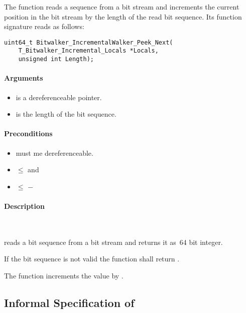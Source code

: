The function \peeknext reads a sequence from a bit stream 
and increments the current position in the bit stream by the 
length of the read bit sequence.
Its function signature reads as follows:\\[1em]


\begin{lstlisting}[style=acsl-block]
uint64_t Bitwalker_IncrementalWalker_Peek_Next(
    T_Bitwalker_Incremental_Locals *Locals,
    unsigned int Length);
\end{lstlisting}


\paragraph{Arguments}
\begin{itemize}
   \item  {} is a dereferenceable pointer.
   \item {} is the length of the bit sequence.
\end{itemize}

\paragraph{Preconditions}
\begin{itemize}
    \item  {} must me dereferenceable.
    \item {} $\leq$  and
    \item {} $\leq$  $-$ 
\end{itemize}

\paragraph{Description}~

\peeknext reads a bit sequence from a bit stream and returns it as~64 bit integer.


If the bit sequence is not valid the function shall return .

The function increments the value  by .


\clearpage

\subsection{Informal Specification of }


